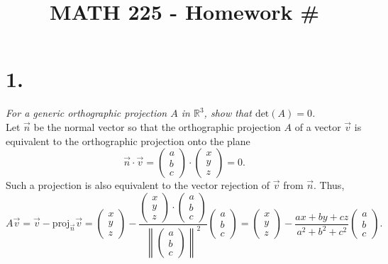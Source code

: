 \documentclass[12pt]{article}
\title{\vspace{-2\baselineskip}MATH 225 - Homework \#\HOMEWORKNUM}
\author{\NAME}
\date{\DATE}
\newcommand{\norm}[1]{\left\lVert#1\right\rVert}
\begin{document}
\maketitle

\section*{1.}
\textit{For a generic orthographic projection $A$ in $\mathbb{R}^3$, show that
$\text{det}(A) = 0$.} \\[\baselineskip]
Let $\vec{n}$ be the normal vector so that the orthographic projection $A$ of
a vector $\vec{v}$ is equivalent to the orthographic projection onto the plane
\begin{equation*}
	\vec{n} \cdot \vec{v}
	=
	\begin{pmatrix} a \\ b \\ c \end{pmatrix}
	\cdot
	\begin{pmatrix} x \\ y \\ z \end{pmatrix}
	=
	0
	.
\end{equation*}
Such a projection is also equivalent to the vector rejection of $\vec{v}$ from
$\vec{n}$. Thus, 
\begin{equation*}
	A\vec{v}
	=
	\vec{v} - \text{proj}_{\vec{n}}\vec{v}
	=
	\begin{pmatrix} x \\ y \\ z \end{pmatrix}
	-
	\frac{
		\begin{pmatrix} x \\ y \\ z \end{pmatrix}
		\cdot
		\begin{pmatrix} a \\ b \\ c \end{pmatrix}
	}{
		\norm{\begin{pmatrix} a \\ b \\ c \end{pmatrix}}^2
	}
	\begin{pmatrix} a \\ b \\ c \end{pmatrix}
	=
	\begin{pmatrix} x \\ y \\ z \end{pmatrix}
	-
	\frac{ax + by + cz}{a^2 + b^2 + c^2}
	\begin{pmatrix} a \\ b \\ c \end{pmatrix}
	.
\end{equation*}
\end{document}

